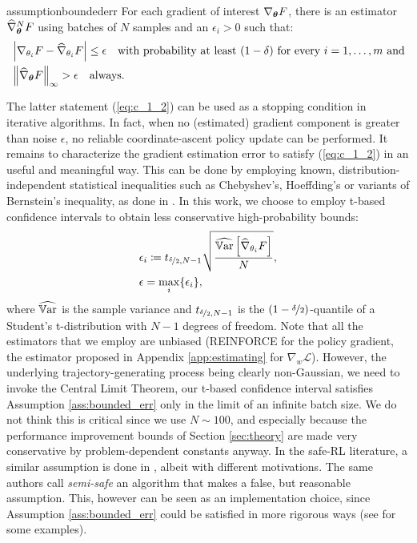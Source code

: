 \begin{restatable}[]{assumption}{boundederr}\label{ass:bounded_err}
	For each gradient of interest $\nabla_{\vtheta} F$, there is an estimator $\widehat{\nabla}_{\vtheta}^NF$ using batches of $N$ samples and an $\epsilon_i>0$ such that:
	\begin{align}
	&\left|\nabla_{\theta_i}F - \widehat{\nabla}_{\theta_i}F\right| \leq \epsilon 
		\quad\text{with probability at least $(1-\delta)$ for every $i=1,\dots,m$ and}\label{eq:c_1_1}\\
	&\norm[\infty]{\widehat{\nabla}_{\vtheta}F} > \epsilon\quad\text{always}.\label{eq:c_1_2}
	\end{align}
\end{restatable}
The latter statement (\ref{eq:c_1_2}) can be used as a stopping condition in iterative algorithms. In fact, when no (estimated) gradient component is greater than noise $\epsilon$, no reliable coordinate-ascent policy update can be performed. It remains to characterize the gradient estimation error to satisfy (\ref{eq:c_1_2}) in an useful and meaningful way. This can be done by employing known, distribution-independent statistical inequalities such as Chebyshev's, Hoeffding's or variants of Bernstein's inequality, as done in \cite{adaptive_batch}. In this work, we choose to employ t-based confidence intervals to obtain less conservative high-probability bounds:
\begin{align*}
	&\epsilon_i \coloneqq t_{\nicefrac{\delta}{2}, N-1}\sqrt{\frac{\widehat{\Var}\left[\widehat{\nabla}_{\theta_i}F\right]}
		{N}},\\
	&\epsilon = \max_i\{\epsilon_i\},
\end{align*}
where $\widehat{\Var}$ is the sample variance and $t_{\nicefrac{\delta}{2},N-1}$ is the $(1-\nicefrac{\delta}{2})$-quantile of a Student's t-distribution with $N-1$ degrees of freedom. Note that all the estimators that we employ are unbiased (REINFORCE for the policy gradient, the estimator proposed in Appendix \ref{app:estimating} for $\nabla_w\mathcal{L}$). However, the underlying trajectory-generating process being clearly non-Gaussian, we need to invoke the Central Limit Theorem, \ie our t-based confidence interval satisfies Assumption \ref{ass:bounded_err} only in the limit of an infinite batch size. We do not think this is critical since we use $N\sim 100$, and especially because the performance improvement bounds of Section \ref{sec:theory} are made very conservative by problem-dependent constants anyway. In the safe-RL literature, a similar  assumption is done in \cite{pmlr-v37-thomas15}, albeit with different motivations. The same authors call \textit{semi-safe} an algorithm that makes a false, but reasonable assumption. This, however can be seen as an implementation choice, since Assumption \ref{ass:bounded_err} could be satisfied in more rigorous ways (see \cite{adaptive_batch} for some examples).

